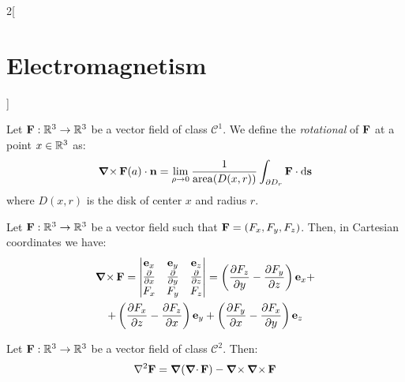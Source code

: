 \documentclass[../../../main.tex]{subfiles}
\begin{document}
\begin{multicols}{2}[\section{Electromagnetism}]
  \begin{definition}[Rotational]
    Let $\boldsymbol{\mathrm{F}}:\mathbb{R}^3\rightarrow\mathbb{R}^3$ be a vector field of class $\mathcal{C}^1$. We define the \emph{rotational} of $\boldsymbol{\mathrm{F}}$ at a point $x\in\mathbb{R}^3$ as:
    $$\operatorname{\boldsymbol{\mathrm{\nabla}}\times}\boldsymbol{\mathrm{F}}(a)\cdot\boldsymbol{\mathrm{n}}=\lim_{\rho\to 0}\frac{1}{\operatorname{area}(D(x,r))}\int_{\partial D_r}\boldsymbol{\mathrm{F}}\cdot \dd{\boldsymbol{\mathrm{s}}}$$
    where $D(x,r)$ is the disk of center $x$ and radius $r$.
  \end{definition}
  \begin{proposition}
    Let $\boldsymbol{\mathrm{F}}:\mathbb{R}^3\rightarrow\mathbb{R}^3$ be a vector field such that $\boldsymbol{\mathrm{F}}=(F_x,F_y,F_z)$. Then, in Cartesian coordinates we have:
    \begin{multline*}
      \operatorname{\boldsymbol{\mathrm{\nabla}}\times} \boldsymbol{\mathrm{F}}=
      \begin{vmatrix}
        \boldsymbol{\mathrm{e}}_x  & \boldsymbol{\mathrm{e}}_y  & \boldsymbol{\mathrm{e}}_z  \\
        \pdv{}{x} & \pdv{}{y} & \pdv{}{z} \\
        F_x       & F_y       & F_z       \\
      \end{vmatrix} = \left(\frac{\partial F_z}{\partial y}-\frac{\partial F_y}{\partial z}\right)\boldsymbol{\mathrm{e}}_x+\\+\left(\frac{\partial F_x}{\partial z}-\frac{\partial F_z}{\partial x}\right)\boldsymbol{\mathrm{e}}_y+\left(\frac{\partial F_y}{\partial x}-\frac{\partial F_x}{\partial y}\right)\boldsymbol{\mathrm{e}}_z
    \end{multline*}
  \end{proposition}
  \begin{proposition}
    Let $\boldsymbol{\mathrm{F}}:\mathbb{R}^3\rightarrow\mathbb{R}^3$ be a vector field of class $\mathcal{C}^2$. Then: $$\laplacian\vf{F}=\grad(\divp\vf{F})-\rotp\rotp\vf{F}$$
  \end{proposition}

\end{multicols}
\end{document}

